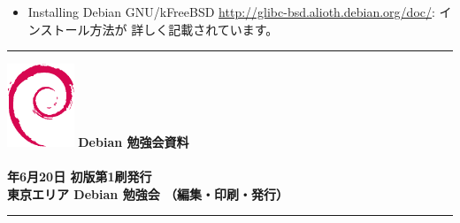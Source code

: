 \documentclass[mingoth,a4paper]{jsarticle}
\newcommand{\debmtgyear}{2009}
\newcommand{\debmtgmonth}{6}
\newcommand{\debmtgdate}{20}
\begin{document}
\begin{itemize}
 \item Installing Debian GNU/kFreeBSD
       \url{http://glibc-bsd.alioth.debian.org/doc/}: インストール方法が
       詳しく記載されています。
\end{itemize}

\clearpage


\cleartooddpage

\vspace*{15cm}
\hrule
\vspace{2mm}
\includegraphics[width=2cm]{image200502/openlogo-nd.eps}
\noindent \Large \bf Debian 勉強会資料\\ \\
\noindent \normalfont \debmtgyear{}年\debmtgmonth{}月\debmtgdate{}日 \hspace{5mm}  初版第1刷発行\\
\noindent \normalfont 東京エリア Debian 勉強会 （編集・印刷・発行）\\
\hrule
\end{document}
